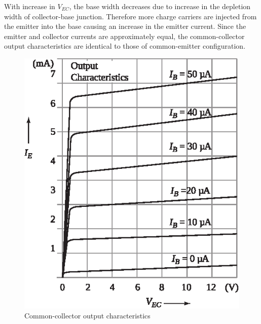 With increase in $V_{EC}$, the base width decreases due to increase in the depletion width of collector-base junction. Therefore more charge carriers are injected from the emitter into the base causing an increase in the emitter current. Since the emitter and collector currents are approximately equal, the common-collector output characteristics are identical to those of common-emitter configuration.
\begin{figure}[H]
\centering
\includegraphics[scale=.88]{chap2/S3-EE-03-033b.eps}
\caption{Common-collector output characteristics}\label{fig3.34}
\end{figure}

